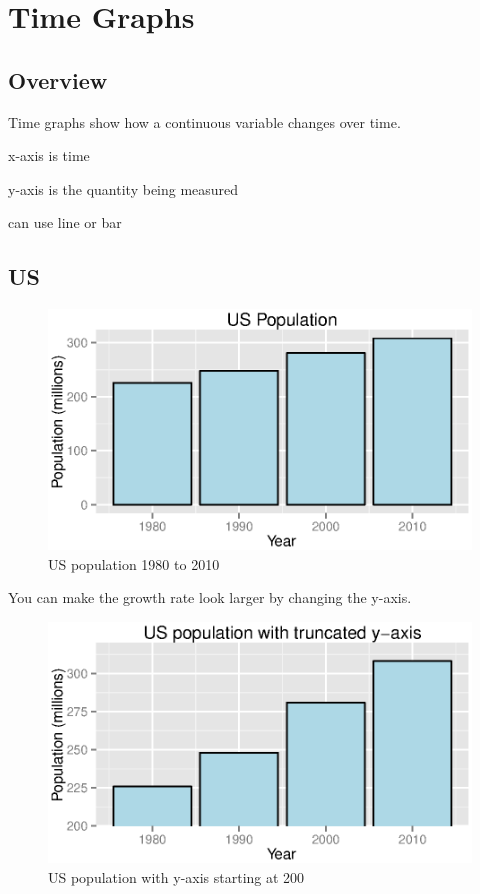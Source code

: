 \documentclass{exam}
\begin{document}
  \section{Time Graphs}

  \subsection{Overview}

  Time graphs show how a continuous variable changes over time.  

  \begin{itemize*}
    \item x-axis is time
    \item y-axis is the quantity being measured
    \item can use line or bar
  \end{itemize*}

  \subsection{US}
  \begin{figure}[H]
    \centering
    \includegraphics[scale = 0.9]{figures/us_population.eps}
    \caption{US population 1980 to 2010}
  \end{figure}

  You can make the growth rate look larger by changing the y-axis.
  \begin{figure}[H]
    \centering
    \includegraphics[scale = 0.9]{figures/us_population_limited_range.eps}
    \caption{US population with y-axis starting at 200}
  \end{figure}
\end{document}
